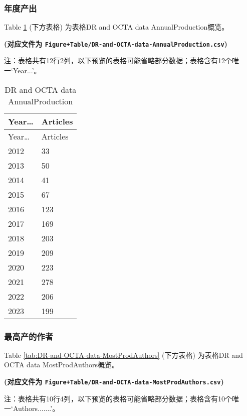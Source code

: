 \documentclass[
]{article}
\begin{document}
\hypertarget{ux5e74ux5ea6ux4ea7ux51fa}{%
\subsubsection{年度产出}\label{ux5e74ux5ea6ux4ea7ux51fa}}

Table \ref{tab:DR-and-OCTA-data-AnnualProduction} (下方表格) 为表格DR and OCTA data AnnualProduction概览。

\textbf{(对应文件为 \texttt{Figure+Table/DR-and-OCTA-data-AnnualProduction.csv})}

\begin{center}\begin{tcolorbox}[colback=gray!10, colframe=gray!50, width=0.9\linewidth, arc=1mm, boxrule=0.5pt]注：表格共有12行2列，以下预览的表格可能省略部分数据；表格含有12个唯一`Year...'。
\end{tcolorbox}
\end{center}

\begin{longtable}[]{@{}ll@{}}
\caption{\label{tab:DR-and-OCTA-data-AnnualProduction}DR and OCTA data AnnualProduction}\tabularnewline
\toprule
Year\ldots{} & Articles\tabularnewline
\midrule
\endfirsthead
\toprule
Year\ldots{} & Articles\tabularnewline
\midrule
\endhead
2012 & 33\tabularnewline
2013 & 50\tabularnewline
2014 & 41\tabularnewline
2015 & 67\tabularnewline
2016 & 123\tabularnewline
2017 & 169\tabularnewline
2018 & 203\tabularnewline
2019 & 209\tabularnewline
2020 & 223\tabularnewline
2021 & 278\tabularnewline
2022 & 206\tabularnewline
2023 & 199\tabularnewline
\bottomrule
\end{longtable}

\hypertarget{ux6700ux9ad8ux4ea7ux7684ux4f5cux8005}{%
\subsubsection{最高产的作者}\label{ux6700ux9ad8ux4ea7ux7684ux4f5cux8005}}

Table \ref{tab:DR-and-OCTA-data-MostProdAuthors} (下方表格) 为表格DR and OCTA data MostProdAuthors概览。

\textbf{(对应文件为 \texttt{Figure+Table/DR-and-OCTA-data-MostProdAuthors.csv})}

\begin{center}\begin{tcolorbox}[colback=gray!10, colframe=gray!50, width=0.9\linewidth, arc=1mm, boxrule=0.5pt]注：表格共有10行4列，以下预览的表格可能省略部分数据；表格含有10个唯一`Authors.......'。
\end{tcolorbox}
\end{center}
\end{document}
